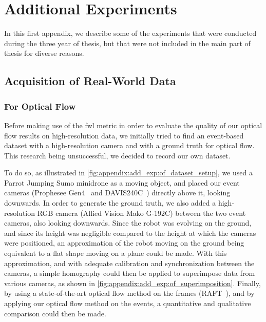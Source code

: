 \chapter{Additional Experiments}\label{sec:appendix:add_exp}
In this first appendix, we describe some of the experiments that were conducted during the three year of thesis, but that were not included in the main part of thesis for diverse reasons. 

\section{Acquisition of Real-World Data}

\subsection{For Optical Flow}
Before making use of the \acrfull{fwl} metric in order to evaluate the quality of our optical flow results on high-resolution data, we initially tried to find an event-based dataset with a high-resolution camera and with a ground truth for optical flow. This research being unsuccessful, we decided to record our own dataset.

To do so, as illustrated in \cref{fig:appendix:add_exp:of_dataset_setup}, we used a Parrot Jumping Sumo minidrone as a moving object, and placed our event cameras (Prophesee Gen4~\cite{Finateu2020510A1} and DAVIS240C~\cite{Brandli2014A2}) directly above it, looking downwards. In order to generate the ground truth, we also added a high-resolution RGB camera (Allied Vision Mako G-192C) between the two event cameras, also looking downwards. Since the robot was evolving on the ground, and since its height was negligible compared to the height at which the cameras were positioned, an approximation of the robot moving on the ground being equivalent to a flat shape moving on a plane could be made. With this approximation, and with adequate calibration and synchronization between the cameras, a simple homography could then be applied to superimpose data from various cameras, as shown in \cref{fig:appendix:add_exp:of_superimposition}. Finally, by using a state-of-the-art optical flow method on the frames (RAFT~\cite{Teed2020RAFTRA}), and by applying our optical flow method on the events, a quantitative and qualitative comparison could then be made.

